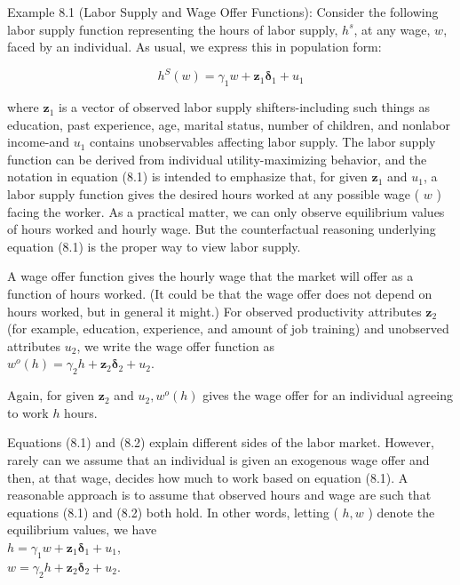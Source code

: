 \documentclass[10pt]{article}
\begin{document}
Example 8.1 (Labor Supply and Wage Offer Functions): Consider the following labor supply function representing the hours of labor supply, $h^{s}$, at any wage, $w$, faced by an individual. As usual, we express this in population form:


\begin{equation*}
h^{S}(w)=\gamma_{1} w+\mathbf{z}_{1} \boldsymbol{\delta}_{1}+u_{1} \tag{8.1}
\end{equation*}


where $\mathbf{z}_{1}$ is a vector of observed labor supply shifters-including such things as education, past experience, age, marital status, number of children, and nonlabor income-and $u_{1}$ contains unobservables affecting labor supply. The labor supply\\
function can be derived from individual utility-maximizing behavior, and the notation in equation (8.1) is intended to emphasize that, for given $\mathbf{z}_{1}$ and $u_{1}$, a labor supply function gives the desired hours worked at any possible wage ( $w$ ) facing the worker. As a practical matter, we can only observe equilibrium values of hours worked and hourly wage. But the counterfactual reasoning underlying equation (8.1) is the proper way to view labor supply.

A wage offer function gives the hourly wage that the market will offer as a function of hours worked. (It could be that the wage offer does not depend on hours worked, but in general it might.) For observed productivity attributes $\mathbf{z}_{2}$ (for example, education, experience, and amount of job training) and unobserved attributes $u_{2}$, we write the wage offer function as\\
$w^{o}(h)=\gamma_{2} h+\mathbf{z}_{2} \boldsymbol{\delta}_{2}+u_{2}$.

Again, for given $\mathbf{z}_{2}$ and $u_{2}, w^{o}(h)$ gives the wage offer for an individual agreeing to work $h$ hours.

Equations (8.1) and (8.2) explain different sides of the labor market. However, rarely can we assume that an individual is given an exogenous wage offer and then, at that wage, decides how much to work based on equation (8.1). A reasonable approach is to assume that observed hours and wage are such that equations (8.1) and (8.2) both hold. In other words, letting ( $h, w$ ) denote the equilibrium values, we have\\
$h=\gamma_{1} w+\mathbf{z}_{1} \boldsymbol{\delta}_{1}+u_{1}$,\\
$w=\gamma_{2} h+\mathbf{z}_{2} \boldsymbol{\delta}_{2}+u_{2}$.
\end{document}
